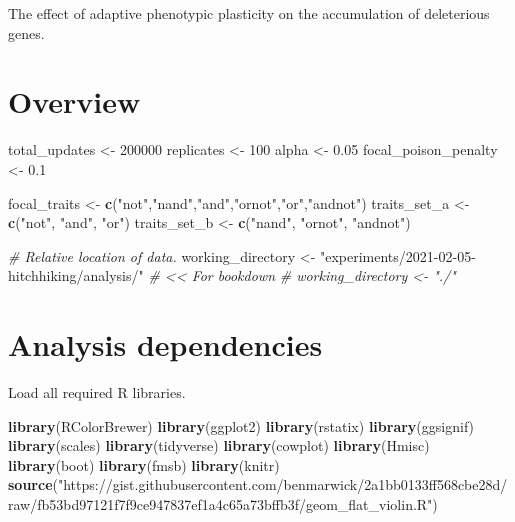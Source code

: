 \documentclass[]{book}
\newenvironment{Shaded}{\begin{snugshade}}{\end{snugshade}}
\newcommand{\CommentTok}[1]{\textcolor[rgb]{0.56,0.35,0.01}{\textit{#1}}}
\newcommand{\DecValTok}[1]{\textcolor[rgb]{0.00,0.00,0.81}{#1}}
\newcommand{\FloatTok}[1]{\textcolor[rgb]{0.00,0.00,0.81}{#1}}
\newcommand{\KeywordTok}[1]{\textcolor[rgb]{0.13,0.29,0.53}{\textbf{#1}}}
\newcommand{\NormalTok}[1]{#1}
\newcommand{\StringTok}[1]{\textcolor[rgb]{0.31,0.60,0.02}{#1}}
\begin{document}
The effect of adaptive phenotypic plasticity on the accumulation of deleterious genes.

\hypertarget{overview-3}{%
\section{Overview}\label{overview-3}}

\begin{Shaded}
\begin{Highlighting}[]
\NormalTok{total_updates <-}\StringTok{ }\DecValTok{200000}
\NormalTok{replicates <-}\StringTok{ }\DecValTok{100}
\NormalTok{alpha <-}\StringTok{ }\FloatTok{0.05}
\NormalTok{focal_poison_penalty <-}\StringTok{ }\FloatTok{0.1}

\NormalTok{focal_traits <-}\StringTok{ }\KeywordTok{c}\NormalTok{(}\StringTok{"not"}\NormalTok{,}\StringTok{"nand"}\NormalTok{,}\StringTok{"and"}\NormalTok{,}\StringTok{"ornot"}\NormalTok{,}\StringTok{"or"}\NormalTok{,}\StringTok{"andnot"}\NormalTok{)}
\NormalTok{traits_set_a <-}\StringTok{ }\KeywordTok{c}\NormalTok{(}\StringTok{"not"}\NormalTok{, }\StringTok{"and"}\NormalTok{, }\StringTok{"or"}\NormalTok{)}
\NormalTok{traits_set_b <-}\StringTok{ }\KeywordTok{c}\NormalTok{(}\StringTok{"nand"}\NormalTok{, }\StringTok{"ornot"}\NormalTok{, }\StringTok{"andnot"}\NormalTok{)}

\CommentTok{# Relative location of data.}
\NormalTok{working_directory <-}\StringTok{ "experiments/2021-02-05-hitchhiking/analysis/"} \CommentTok{# << For bookdown}
\CommentTok{# working_directory <- "./"}
\end{Highlighting}
\end{Shaded}

\hypertarget{analysis-dependencies-3}{%
\section{Analysis dependencies}\label{analysis-dependencies-3}}

Load all required R libraries.

\begin{Shaded}
\begin{Highlighting}[]
\KeywordTok{library}\NormalTok{(RColorBrewer)}
\KeywordTok{library}\NormalTok{(ggplot2)}
\KeywordTok{library}\NormalTok{(rstatix)}
\KeywordTok{library}\NormalTok{(ggsignif)}
\KeywordTok{library}\NormalTok{(scales)}
\KeywordTok{library}\NormalTok{(tidyverse)}
\KeywordTok{library}\NormalTok{(cowplot)}
\KeywordTok{library}\NormalTok{(Hmisc)}
\KeywordTok{library}\NormalTok{(boot)}
\KeywordTok{library}\NormalTok{(fmsb)}
\KeywordTok{library}\NormalTok{(knitr)}
\KeywordTok{source}\NormalTok{(}\StringTok{"https://gist.githubusercontent.com/benmarwick/2a1bb0133ff568cbe28d/raw/fb53bd97121f7f9ce947837ef1a4c65a73bffb3f/geom_flat_violin.R"}\NormalTok{)}
\end{Highlighting}
\end{Shaded}
\end{document}

